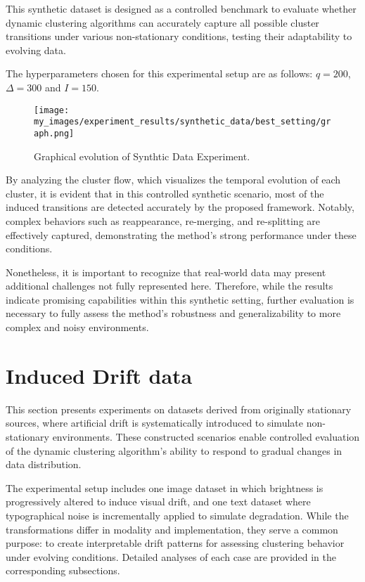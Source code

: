 This synthetic dataset is designed as a controlled benchmark to evaluate
whether dynamic clustering algorithms can accurately capture all possible
cluster transitions under various non-stationary conditions, testing their
adaptability to evolving data.

The hyperparameters chosen for this experimental setup are as follows: $q =
      200$, $\Delta = 300$ and $I=150$.

\begin{figure}[H]
      \centering
      \texttt{[image: my\_images/experiment\_results/synthetic\_data/best\_setting/graph.png]}
      \caption{Graphical evolution of Synthtic Data Experiment.}
\end{figure}

By analyzing the cluster flow, which visualizes the temporal evolution of each
cluster, it is evident that in this controlled synthetic scenario, most of the
induced transitions are detected accurately by the proposed framework. Notably,
complex behaviors such as reappearance, re-merging, and re-splitting are
effectively captured, demonstrating the method's strong performance under these
conditions.

Nonetheless, it is important to recognize that real-world data may present
additional challenges not fully represented here. Therefore, while the results
indicate promising capabilities within this synthetic setting, further
evaluation is necessary to fully assess the method's robustness and
generalizability to more complex and noisy environments.

\section{Induced Drift data}\label{sec:induced_drift_data}

This section presents experiments on datasets derived from originally
stationary sources, where artificial drift is systematically introduced to
simulate non-stationary environments. These constructed scenarios enable
controlled evaluation of the dynamic clustering algorithm's ability to respond
to gradual changes in data distribution.

The experimental setup includes one image dataset in which brightness is
progressively altered to induce visual drift, and one text dataset where
typographical noise is incrementally applied to simulate degradation. While the
transformations differ in modality and implementation, they serve a common
purpose: to create interpretable drift patterns for assessing clustering
behavior under evolving conditions. Detailed analyses of each case are provided
in the corresponding subsections.

